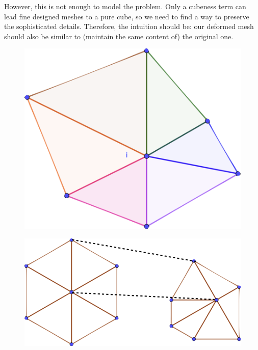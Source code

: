 \documentclass[a4paper,10pt]{article}
\begin{document}
However, this is not enough to model the problem. Only a cubeness term can lead fine designed meshes to a pure cube, so we need to find a way to preserve the sophisticated details. Therefore, the intuition should be: our deformed mesh should also be similar to (maintain the same content of) the original one.
	\begin{figure}[ht!]
		\centering
		\begin{minipage}[t]{.45\textwidth}
			  \centering
			  \includegraphics[width=0.8\linewidth]{figures/unit_area}
			  \label{fig:unit-area}
		\end{minipage}%
		\begin{minipage}[t]{.55\textwidth}
			  \centering
			  \includegraphics[width=0.9\linewidth]{figures/arap}
			  \label{fig:arap}
		\end{minipage}
	\end{figure}
\end{document}
